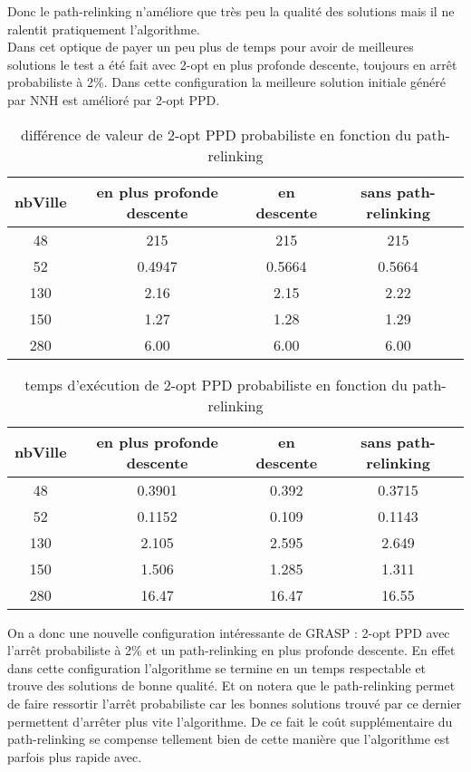 \documentclass[12pt,a4paper]{article}
\begin{document}
Donc le path-relinking n’améliore que très peu la qualité des solutions mais il ne ralentit pratiquement l'algorithme.\\

Dans cet optique de payer un peu plus de temps pour avoir de meilleures solutions le test a été fait avec 2-opt en plus profonde descente, toujours en arrêt probabiliste à 2\%. Dans cette configuration la meilleure solution initiale généré par NNH est amélioré par 2-opt PPD.\\

\begin{table}[!h]
\centering
\begin{tabular}{|*{4}{c|}}
\hline
nbVille & en plus profonde descente & en descente & sans path-relinking \\
\hline
48 & 215 & 215 & 215 \\
52 & 0.4947 & 0.5664 & 0.5664 \\
130 & 2.16 & 2.15 & 2.22 \\
150 & 1.27 & 1.28 & 1.29 \\
280 & 6.00 & 6.00 & 6.00 \\
\hline
\end{tabular}
\caption{différence de valeur de 2-opt PPD probabiliste en fonction du path-relinking}
\label{val2optPPDgraspPR}
\end{table}

\begin{table}[!h]
\centering
\begin{tabular}{|*{4}{c|}}
\hline
nbVille & en plus profonde descente & en descente & sans path-relinking \\
\hline
48 & 0.3901 & 0.392 & 0.3715 \\
52 & 0.1152 & 0.109 & 0.1143 \\
130 & 2.105 & 2.595 & 2.649 \\
150 & 1.506 & 1.285 & 1.311 \\
280 & 16.47 & 16.47 & 16.55 \\
\hline
\end{tabular}
\caption{temps d’exécution de 2-opt PPD probabiliste en fonction du path-relinking}
\label{temps2optPPDgraspPR}
\end{table}

On a donc une nouvelle configuration intéressante de GRASP : 2-opt PPD avec l’arrêt probabiliste à 2\% et un path-relinking en plus profonde descente. En effet dans cette configuration l'algorithme se termine en un temps respectable et trouve des solutions de bonne qualité. Et on notera que le path-relinking permet de faire ressortir l’arrêt probabiliste car les bonnes solutions trouvé par ce dernier permettent d’arrêter plus vite l'algorithme. De ce fait le coût supplémentaire du path-relinking se compense tellement bien de cette manière que l'algorithme est parfois plus rapide avec.\\
\end{document}
